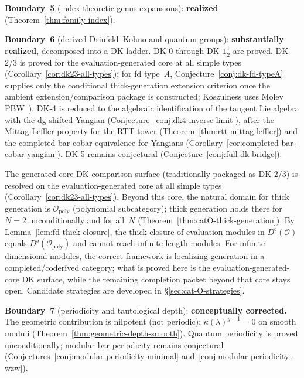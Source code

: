 \noindent\textbf{Boundary~5} (index-theoretic genus expansions):
\textbf{realized}
(Theorem~\ref{thm:family-index}).

\noindent\textbf{Boundary~6} (derived Drinfeld--Kohno and quantum
groups): \textbf{substantially realized}, decomposed into a DK
ladder. DK-0 through DK-$1\frac{1}{2}$ are proved. DK-2/3 is
proved for the evaluation-generated core at all simple types
(Corollary~\ref{cor:dk23-all-types}); for fd type~$A$,
Conjecture~\ref{conj:dk-fd-typeA} supplies only the conditional
thick-generation extension criterion once the ambient
extension/comparison package is constructed; Koszulness uses Molev
PBW~\cite{molev-yangians}).
DK-4 is reduced to the algebraic identification of the tangent
Lie algebra with the dg-shifted Yangian
(Conjecture~\ref{conj:dk4-inverse-limit}), after the
Mittag-Leffler property for the RTT tower
(Theorem~\ref{thm:rtt-mittag-leffler}) and the completed bar-cobar
equivalence for Yangians
(Corollary~\ref{cor:completed-bar-cobar-yangian}).
DK-5 remains conjectural
(Conjecture~\ref{conj:full-dk-bridge}).

\begin{remark}
\label{rem:cat-o-generation-obstruction}
The generated-core DK comparison surface
\textup{(}traditionally packaged as DK-2/3\textup{)} is resolved on the
evaluation-generated core at all simple
types (Corollary~\ref{cor:dk23-all-types}). Beyond this core, the
natural domain for thick generation is
$\mathcal{O}_{\mathrm{poly}}$ (polynomial subcategory); thick
generation holds there for $N = 2$ unconditionally and for all~$N$
(Theorem~\ref{thm:catO-thick-generation}). By
Lemma~\ref{lem:fd-thick-closure}, the thick closure of
evaluation modules in $D^b(\mathcal{O})$ equals
$D^b(\mathcal{O}_{\mathrm{poly}})$ and cannot reach
infinite-length modules. For infinite-dimensional modules, the
correct framework is localizing generation in a completed/coderived
category; what is proved here is the evaluation-generated-core DK
surface, while the remaining completion packet beyond that core stays
open.
Candidate strategies are developed in
\S\ref{sec:cat-O-strategies}.
\end{remark}

\noindent\textbf{Boundary~7} (periodicity and tautological depth):
\textbf{conceptually corrected.}
The geometric contribution is nilpotent (not periodic):
$\kappa(\lambda)^{g-1} = 0$ on smooth moduli
(Theorem~\ref{thm:geometric-depth-smooth}). Quantum periodicity
is proved unconditionally; modular bar periodicity remains
conjectural
(Conjectures~\ref{conj:modular-periodicity-minimal}
and~\ref{conj:modular-periodicity-wzw}).

